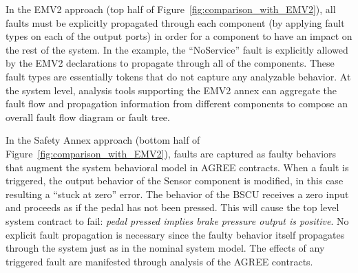 In the EMV2 approach (top half of Figure~\ref{fig:comparison_with_EMV2}), all faults must be explicitly propagated through each component (by applying fault types on each of the output ports) in order for a component to have an impact on the rest of the system. In the example, the ``NoService'' fault is explicitly allowed by the EMV2 declarations to propagate through all of the components.  These fault types are essentially tokens that do not capture any analyzable behavior.  At the system level, analysis tools supporting the EMV2 annex can aggregate the fault flow and propagation information from different components to compose an overall fault flow diagram or fault tree.

In the Safety Annex approach (bottom half of Figure~\ref{fig:comparison_with_EMV2}), faults are captured as faulty behaviors that augment the system behavioral model in AGREE contracts.  When a fault is triggered, the output behavior of the Sensor component is modified, in this case resulting a ``stuck at zero'' error. The behavior of the BSCU receives a zero input and proceeds as if the pedal has not been pressed. This will cause the top level system contract to fail: {\em pedal pressed implies brake pressure output is positive}. No explicit fault propagation is necessary since the faulty behavior itself propagates through the system just as in the nominal system model. The effects of any triggered fault are manifested through analysis of the AGREE contracts. 
 



